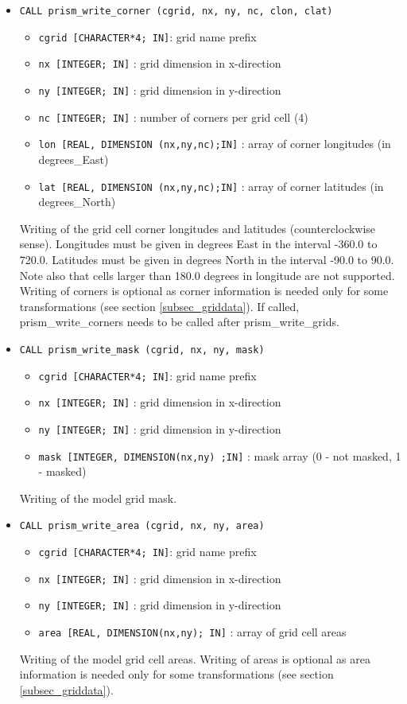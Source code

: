\begin{itemize}
\item {\tt CALL prism\_write\_corner (cgrid, nx, ny, nc, clon, clat)}

 \begin{itemize}
    \item {\tt cgrid [CHARACTER*4; IN]}: grid name prefix
    \item {\tt nx [INTEGER; IN]} : grid dimension in x-direction
    \item {\tt ny [INTEGER; IN]} : grid dimension in y-direction
    \item {\tt nc [INTEGER; IN]} : number of corners per grid cell (4)
    \item {\tt lon [REAL, DIMENSION (nx,ny,nc);IN]} : array of corner
    longitudes (in degrees\_East)
    \item {\tt lat [REAL, DIMENSION (nx,ny,nc);IN]} : array of corner
    latitudes (in degrees\_North)
 \end{itemize}

 Writing of the grid cell corner longitudes and latitudes
 (counterclockwise sense). Longitudes must be given in degrees East in
 the interval -360.0 to 720.0. Latitudes must be given in degrees
 North in the interval -90.0 to 90.0. Note also that cells larger than
 180.0 degrees in longitude are not supported. Writing of corners is
 optional as corner information is needed only for some
 transformations (see section \ref{subsec_griddata}). If called,
 prism\_write\_corners needs to be called after prism\_write\_grids.

\item {\tt CALL prism\_write\_mask (cgrid, nx, ny, mask)}
 \begin{itemize}
    \item {\tt cgrid [CHARACTER*4; IN]}: grid name prefix 
    \item {\tt nx [INTEGER; IN]} : grid dimension in x-direction
    \item {\tt ny [INTEGER; IN]} : grid dimension in y-direction
    \item {\tt mask [INTEGER, DIMENSION(nx,ny) ;IN]} : mask array (0 - not masked, 1 - masked)
 \end{itemize}
Writing of the model grid mask.

\item {\tt CALL prism\_write\_area (cgrid, nx, ny, area)}
 \begin{itemize}
    \item {\tt cgrid [CHARACTER*4; IN]}: grid name prefix
    \item {\tt nx [INTEGER; IN]} : grid dimension in x-direction
    \item {\tt ny [INTEGER; IN]} : grid dimension in y-direction
    \item {\tt area [REAL, DIMENSION(nx,ny); IN]} : array of grid cell areas
 \end{itemize}
Writing of the model grid cell areas. Writing of areas is optional as
area information is needed only for some transformations (see section
\ref{subsec_griddata}).


\end{itemize}
